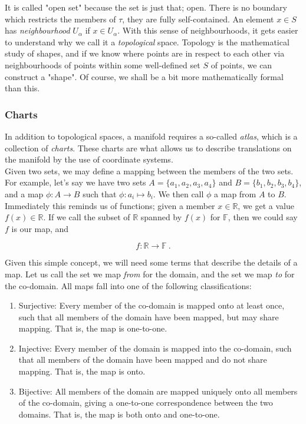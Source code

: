 \documentclass[10pt,twoside]{report}
\begin{document}
\begin{appendices}
	It is called "open set" because the set is just that; open. There is no boundary which restricts the members of $\tau$, they are fully self-contained. An element $x\in S$ has \emph{neighbourhood} $U_\alpha$ if $x\in U_\alpha$. With this sense of neighbourhoods, it gets easier to understand why we call it a \emph{topological} space. Topology is the mathematical study of shapes, and if we know where points are in respect to each other via neighbourhoods of points within some well-defined set $S$ of points, we can construct a "shape". Of course, we shall be a bit more mathematically formal than this.
	
	\subsubsection{Charts}
	In addition to topological spaces, a manifold requires a so-called \emph{atlas}, which is a collection of \emph{charts}. These charts are what allows us to describe translations on the manifold by the use of coordinate systems.\\
	Given two sets, we may define a mapping between the members of the two sets. For example, let's say we have two sets $A = \{a_1,a_2,a_3,a_4\}$ and $B = \{b_1,b_2,b_3,b_4\}$, and a map $\phi: A \to B$ such that $\phi: a_i\mapsto b_i$. We then call $\phi$ a map from $A$ to $B$. Immediately this reminds us of functions; given a member $x \in \mathbb{R}$, we get a value $f(x) \in \mathbb{R}$. If we call the subset of $\mathbb{R}$ spanned by $f(x)$ for $\mathbb{F}$, then we could say $f$ is our map, and
	
	\begin{equation}
	f: \mathbb{R} \to \mathbb{F} \:.
	\end{equation}
	
	Given this simple concept, we will need some terms that describe the details of a map. Let us call the set we map \emph{from} for the domain, and the set we map \emph{to} for the co-domain. All maps fall into one of the following classifications:
	
	\begin{enumerate}
		\item Surjective: Every member of the co-domain is mapped onto at least once, such that all members of the domain have been mapped, but may share mapping. That is, the map is one-to-one.
		\item Injective: Every member of the domain is mapped into the co-domain, such that all members of the domain have been mapped and do not share mapping. That is, the map is onto.
		\item Bijective: All members of the domain are mapped uniquely onto all members of the co-domain, giving a one-to-one correspondence between the two domains. That is, the map is both onto and one-to-one.
	\end{enumerate}
	

\end{appendices}
\end{document}

